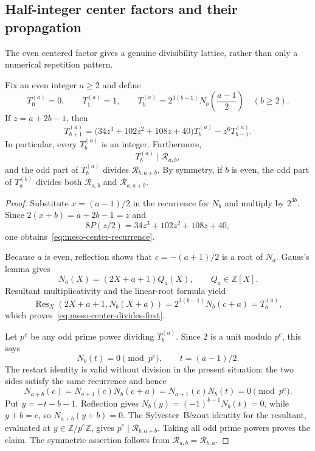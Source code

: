 \subsection{Half-integer center factors and their propagation}

The even centered factor gives a genuine divisibility lattice, rather than
only a numerical repetition pattern.

\begin{proposition}\label{prop:meso-center-recurrence}
Fix an even integer $a\geq2$ and define
\[
 T_0^{(a)}=0,\qquad T_1^{(a)}=1,\qquad
 T_b^{(a)}=2^{3(b-1)}N_b\left(\frac{a-1}{2}\right)
 \quad(b\geq2).
\]
If $z=a+2b-1$, then
\begin{equation}\label{eq:meso-center-recurrence}
 T_{b+1}^{(a)}
 =\bigl(34z^3+102z^2+108z+40\bigr)T_b^{(a)}
 -z^6T_{b-1}^{(a)}.
\end{equation}
In particular, every $T_b^{(a)}$ is an integer.  Furthermore,
\begin{equation}\label{eq:meso-center-divides-first}
 T_b^{(a)}\mid\mathcal R_{a,b},
\end{equation}
and the odd part of $T_b^{(a)}$ divides $\mathcal R_{b,a+b}$.
By symmetry, if $b$ is even, the odd part of $T_a^{(b)}$ divides
both $\mathcal R_{a,b}$ and $\mathcal R_{a,a+b}$.
\end{proposition}

\begin{proof}
Substitute $x=(a-1)/2$ in the recurrence for $N_b$ and multiply by
$2^{3b}$.  Since $2(x+b)=a+2b-1=z$ and
\[
 8P(z/2)=34z^3+102z^2+108z+40,
\]
one obtains~\eqref{eq:meso-center-recurrence}.

Because $a$ is even, reflection shows that
$c=-(a+1)/2$ is a root of $N_a$.  Gauss's lemma gives
\[
 N_a(X)=(2X+a+1)Q_a(X),\qquad Q_a\in\mathbb Z[X].
\]
Resultant multiplicativity and the linear-root formula yield
\[
 \operatorname {Res}_X(2X+a+1,N_b(X+a))
 =2^{3(b-1)}N_b(c+a)=T_b^{(a)},
\]
which proves~\eqref{eq:meso-center-divides-first}.

Let $p^e$ be any odd prime power dividing $T_b^{(a)}$.  Since $2$ is a
unit modulo $p^e$, this says
\[
 N_b(t)=0\pmod {p^e},\qquad t=(a-1)/2.
\]
The restart identity is valid without division in the present situation:
the two sides satisfy the same recurrence and hence
\[
 N_{a+b}(c)=N_{a+1}(c)N_b(c+a)
             =N_{a+1}(c)N_b(t)=0\pmod {p^e}.
\]
Put $y=-t-b-1$.  Reflection gives
$N_b(y)=(-1)^{b-1}N_b(t)=0$, while $y+b=c$, so
$N_{a+b}(y+b)=0$.  The Sylvester--B\'ezout identity for the resultant,
evaluated at $y\in\mathbb Z/p^e\mathbb Z$, gives
$p^e\mid\mathcal R_{b,a+b}$.  Taking all odd prime powers proves the
claim.  The symmetric assertion follows from
$\mathcal R_{a,b}=\mathcal R_{b,a}$.
\end{proof}

